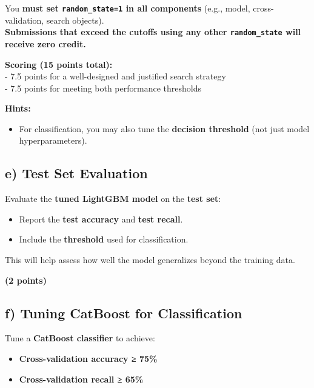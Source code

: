 \documentclass[
  letterpaper,
  DIV=11,
  numbers=noendperiod]{scrreprt}
\providecommand{\tightlist}{%
  \setlength{\itemsep}{0pt}\setlength{\parskip}{0pt}}\usepackage{longtable,booktabs,array}
\begin{document}
You \textbf{must set \texttt{random\_state=1} in all components} (e.g.,
model, cross-validation, search objects).\\
\textbf{Submissions that exceed the cutoffs using any other
\texttt{random\_state} will receive zero credit.}

\textbf{Scoring (15 points total):}\\
- 7.5 points for a well-designed and justified search strategy\\
- 7.5 points for meeting both performance thresholds

\textbf{Hints:}

\begin{itemize}
\tightlist
\item
  For classification, you may also tune the \textbf{decision threshold}
  (not just model hyperparameters).
\end{itemize}

\subsection{e) Test Set Evaluation}\label{e-test-set-evaluation}

Evaluate the \textbf{tuned LightGBM model} on the \textbf{test set}:

\begin{itemize}
\tightlist
\item
  Report the \textbf{test accuracy} and \textbf{test recall}.
\item
  Include the \textbf{threshold} used for classification.
\end{itemize}

This will help assess how well the model generalizes beyond the training
data.

\textbf{(2 points)}

\subsection{f) Tuning CatBoost for
Classification}\label{f-tuning-catboost-for-classification}

Tune a \textbf{CatBoost classifier} to achieve:

\begin{itemize}
\tightlist
\item
  \textbf{Cross-validation accuracy ≥ 75\%}
\item
  \textbf{Cross-validation recall ≥ 65\%}
\end{itemize}
\end{document}
